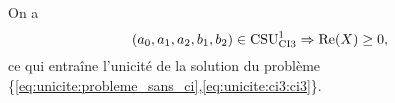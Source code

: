  \begin{prop}
    \label{prop:csu:ci3-1}
    On a 
    \begin{equation*}
      (a_0,a_1,a_2,b_1,b_2) \in \CSU[1]{CI3} \Rightarrow \Re(X)\ge 0,
    \end{equation*}
    ce qui entraîne l'unicité de la solution du problème \{\eqref{eq:unicite:probleme_sans_ci},\eqref{eq:unicite:ci3:ci3}\}.
  \end{prop}
